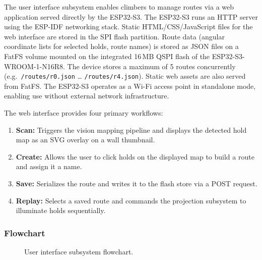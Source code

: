 \documentclass[12pt]{extarticle}
\begin{document}
The user interface subsystem enables climbers to manage routes via a web application served
directly by the ESP32-S3. The ESP32-S3 runs an HTTP server using the ESP-IDF networking stack.
Static HTML/CSS/JavaScript files for the web interface are stored in the SPI flash partition.
Route data (angular coordinate lists for selected holds, route names) is stored as JSON files
on a FatFS volume mounted on the integrated 16\,MB QSPI flash of the ESP32-S3-WROOM-1-N16R8.
The device stores a maximum of 5 routes concurrently (e.g.\ \texttt{/routes/r0.json} \ldots
\texttt{/routes/r4.json}). Static web assets are also served from FatFS.
The ESP32-S3 operates as a Wi-Fi access point in standalone mode, enabling use without
external network infrastructure.

The web interface provides four primary workflows:
\begin{enumerate}
    \item \textbf{Scan:} Triggers the vision mapping pipeline and displays the detected hold
    map as an SVG overlay on a wall thumbnail.
    \item \textbf{Create:} Allows the user to click holds on the displayed map to build a route
    and assign it a name.
    \item \textbf{Save:} Serializes the route and writes it to the flash store via a POST
    request.
    \item \textbf{Replay:} Selects a saved route and commands the projection subsystem to
    illuminate holds sequentially.
\end{enumerate}


\subsubsection{Flowchart}

\begin{figure}[H]
\centering
{}
\caption{User interface subsystem flowchart.}
\label{fig:flow-ui}
\end{figure}
\end{document}
